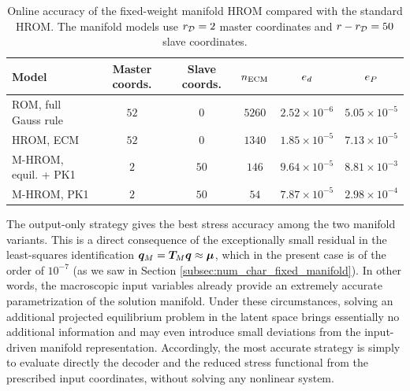 \documentclass[11pt,a4paper]{article}
\begin{document}
\begin{table}[H]
\centering
\caption{Online accuracy of the fixed-weight manifold HROM compared with the
standard HROM. The manifold models use $r_{\mathcal{D}}=2$ master coordinates and
$r-r_{\mathcal{D}}=50$ slave coordinates.}
\label{tab:online_fixed_manifold}
\begin{tabular}{lccccc}
\toprule
Model & Master coords. & Slave coords. & $n_{\mathrm{ECM}}$ & $e_d$ & $e_P$ \\
\midrule
ROM, full Gauss rule & $52$ & $0$ & $5260$
& $2.52\times10^{-6}$ & $5.05\times10^{-5}$ \\
 HROM, ECM & $52$ & $0$ & $1340$
& $1.85\times10^{-5}$ & $7.13\times10^{-5}$ \\
M-HROM, equil. + PK1 & $2$ & $50$ & $146$
& $9.64\times10^{-5}$ & $8.81\times10^{-3}$ \\
M-HROM, PK1   & $2$ & $50$ & $54$
& $7.87\times10^{-5}$ & $2.98\times10^{-4}$ \\
\bottomrule
\end{tabular}
\end{table}


The output-only strategy gives the best stress accuracy among the two manifold
variants. This is a direct consequence of the exceptionally small residual in
the least-squares identification
$\bm{q}_M=\bm{T}_{M}\bm{q}\approx\bm{\mu}$, which in the present case is of the order of
$10^{-7}$ (as we saw in Section \ref{subsec:num_char_fixed_manifold}). In other words, the macroscopic input variables already provide an
extremely accurate parametrization of the solution manifold. Under these
circumstances, solving an additional projected equilibrium problem in the
latent space brings essentially no additional information and may even
introduce small deviations from the input-driven manifold representation.
Accordingly, the most accurate strategy is simply to evaluate directly the
decoder and the reduced stress functional from the prescribed input
coordinates, without solving any nonlinear system.
\end{document}
